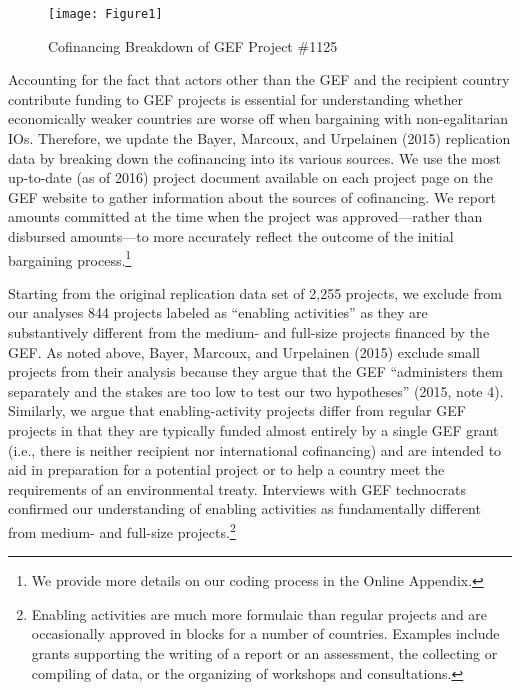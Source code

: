 \documentclass{article}
\begin{document}
\begin{figure}[H]
	\centering
	\caption{Cofinancing Breakdown of GEF Project \#1125}
	\texttt{[image: Figure1]}
	\label{fig:figure1}
\end{figure}

Accounting for the fact that actors other than the GEF and the recipient country contribute funding to GEF projects is essential for understanding whether economically weaker countries are worse off when bargaining with non-egalitarian IOs.  Therefore, we update the Bayer, Marcoux, and Urpelainen (2015) replication data by breaking down the cofinancing into its various sources.  We use the most up-to-date (as of 2016) project document available on each project page on the GEF website to gather information about the sources of cofinancing.  We report amounts committed at the time when the project was approved---rather than disbursed amounts---to more accurately reflect the outcome of the initial bargaining process.\footnote{We provide more details on our coding process in the Online Appendix.}
  
Starting from the original replication data set of 2,255 projects, we exclude from our analyses 844 projects labeled as “enabling activities” as they are substantively different from the medium- and full-size projects financed by the GEF.  As noted above, Bayer, Marcoux, and Urpelainen (2015) exclude small projects from their analysis because they argue that the GEF “administers them separately and the stakes are too low to test our two hypotheses” (2015, note 4).  Similarly, we argue that enabling-activity projects differ from regular GEF projects in that they are typically funded almost entirely by a single GEF grant (i.e., there is neither recipient nor international cofinancing) and are intended to aid in preparation for a potential project or to help a country meet the requirements of an environmental treaty.  Interviews with GEF technocrats confirmed our understanding of enabling activities as fundamentally different from medium- and full-size projects.\footnote{Enabling activities are much more formulaic than regular projects and are occasionally approved in blocks for a number of countries. Examples include grants supporting the writing of a report or an assessment, the collecting or compiling of data, or the organizing of workshops and consultations.}   
\end{document}
